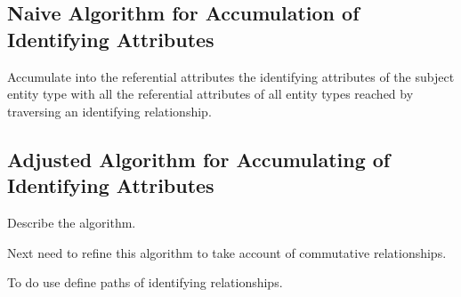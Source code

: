 \subsection{Naive Algorithm for Accumulation of Identifying Attributes}
Accumulate into the referential attributes the identifying attributes of the subject entity type
with all the referential attributes of all entity types reached by traversing an identifying relationship.
\subsection{Adjusted Algorithm for Accumulating of Identifying Attributes}

Describe the algorithm.

Next need to refine this algorithm to take account of commutative relationships. 

To do use define paths of identifying relationships.
